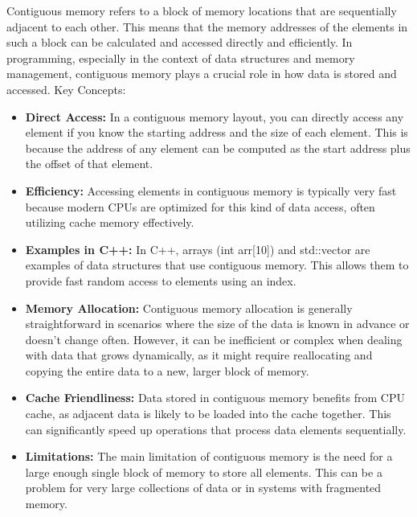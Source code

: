 \documentclass{report}
\begin{document}
    \begin{concept}
       Contiguous memory refers to a block of memory locations that are sequentially adjacent to each other. This means that the memory addresses of the elements in such a block can be calculated and accessed directly and efficiently. In programming, especially in the context of data structures and memory management, contiguous memory plays a crucial role in how data is stored and accessed. 
       \bigbreak \noindent 
       Key Concepts:
       \begin{itemize}
            \item \textbf{Direct Access:} In a contiguous memory layout, you can directly access any element if you know the starting address and the size of each element. This is because the address of any element can be computed as the start address plus the offset of that element.
            \item \textbf{Efficiency:} Accessing elements in contiguous memory is typically very fast because modern CPUs are optimized for this kind of data access, often utilizing cache memory effectively.
            \item \textbf{Examples in C++:} In C++, arrays (int arr[10]) and std::vector are examples of data structures that use contiguous memory. This allows them to provide fast random access to elements using an index.
            \item \textbf{Memory Allocation:} Contiguous memory allocation is generally straightforward in scenarios where the size of the data is known in advance or doesn't change often. However, it can be inefficient or complex when dealing with data that grows dynamically, as it might require reallocating and copying the entire data to a new, larger block of memory.
            \item \textbf{Cache Friendliness:} Data stored in contiguous memory benefits from CPU cache, as adjacent data is likely to be loaded into the cache together. This can significantly speed up operations that process data elements sequentially.
            \item \textbf{Limitations:} The main limitation of contiguous memory is the need for a large enough single block of memory to store all elements. This can be a problem for very large collections of data or in systems with fragmented memory.
       \end{itemize}
    \end{concept}
    

    \pagebreak
    \bigbreak \noindent 
\end{document}
